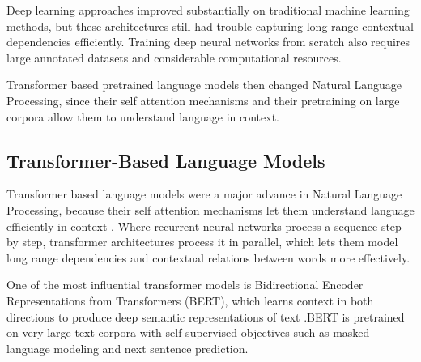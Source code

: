 \documentclass[12pt]{report}
\begin{document}
Deep learning approaches improved substantially on traditional machine learning methods, but these architectures still had trouble capturing long range contextual dependencies efficiently. Training deep neural networks from scratch also requires large annotated datasets and considerable computational resources.

Transformer based pretrained language models then changed Natural Language Processing, since their self attention mechanisms and their pretraining on large corpora allow them to understand language in context.

\subsection{Transformer-Based Language Models}

Transformer based language models were a major advance in Natural Language Processing, because their self attention mechanisms let them understand language efficiently in context \cite{vaswani2017attention}. Where recurrent neural networks process a sequence step by step, transformer architectures process it in parallel, which lets them model long range dependencies and contextual relations between words more effectively.

One of the most influential transformer models is Bidirectional Encoder Representations from Transformers (BERT), which learns context in both directions to produce deep semantic representations of text \cite{devlin2019bert}.BERT is pretrained on very large text corpora with self supervised objectives such as masked language modeling and next sentence prediction.
\end{document}

